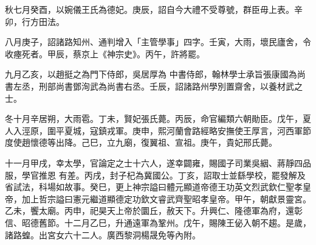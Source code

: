 \begin{pinyinscope}
 秋七月癸酉，以婉儀王氏為德妃。庚辰，詔自今大禮不受尊號，群臣毋上表。辛卯，行方田法。



 八月庚子，詔諸路知州、通判增入「主管學事」四字。壬寅，大雨，壞民廬舍，令收瘞死者。甲辰，蔡京上《神宗史》。丙午，許將罷。



 九月乙亥，以趙挺之為門下侍郎，吳居厚為
 中書侍郎，翰林學士承旨張康國為尚書左丞，刑部尚書鄧洵武為尚書右丞。壬辰，詔諸路州學別置齋舍，以養材武之士。



 冬十月辛居朔，大雨雹。丁未，賢妃張氏薨。丙辰，命官編類六朝勛臣。戊午，夏人入涇原，圍平夏城，寇鎮戎軍。庚申，熙河蘭會路經略安撫使王厚言，河西軍節度使趙懷德等出降。己巳，立九廟，復翼祖、宣祖。庚午，貴妃邢氏薨。



 十一月甲戌，幸太學，官論定之士十六人，遂幸闢雍，賜國子司業吳絪、蔣靜四品服，學官推恩
 有差。丙戌，封子杞為冀國公。丁亥，詔取士並繇學校，罷發解及省試法，科場如故事。癸巳，更上神宗謚曰體元顯道帝德王功英文烈武欽仁聖孝皇帝，加上哲宗謚曰憲元繼道顯德定功欽文睿武齊聖昭孝皇帝。甲午，朝獻景靈宮。乙未，饗太廟。丙申，祀昊天上帝於圜丘，赦天下。升興仁、隆德軍為府，還彰信、昭德舊節。十二月乙巳，升通遠軍為鞏州。戊午，賜陳王佖入朝不趨。是歲，諸路蝗。出宮女六十二人。廣西黎洞楊晟免等內附。



\end{pinyinscope}